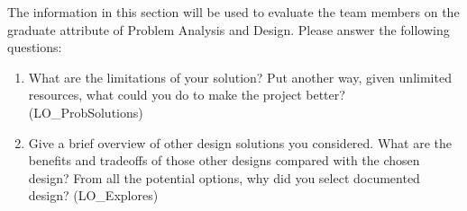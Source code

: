 \documentclass[12pt, titlepage]{article}
\begin{document}
The information in this section will be used to evaluate the team members on the
graduate attribute of Problem Analysis and Design.  Please answer the following questions:

\begin{enumerate}
  \item What are the limitations of your solution?  Put another way, given
  unlimited resources, what could you do to make the project better? (LO\_ProbSolutions)
  \item Give a brief overview of other design solutions you considered.  What
  are the benefits and tradeoffs of those other designs compared with the chosen
  design?  From all the potential options, why did you select documented design?
  (LO\_Explores)
\end{enumerate}
\end{document}
